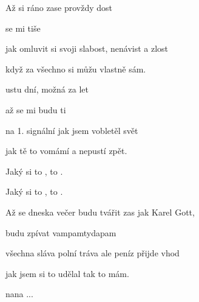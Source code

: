 

\zs
Až si  ráno  zase
 provždy dost

 se mi  tiše 

jak omluvit si svoji slabost, nenávist a zlost

když za všechno si můžu vlastně sám.
\ks

\zr
{}ustu dní, možná za  let

až se mi  budu ti 

na 1. signální jak jsem vobletěl svět

jak tě to vomámí a nepustí zpět.

Jaký si to ,  to .

Jaký si to ,  to .
\kr

\zs
Až se dneska večer budu tvářit zas jak Karel Gott,

budu zpívat vampamtydapam

všechna sláva polní tráva ale peníz přijde vhod

jak jsem si to udělal tak to mám.
\ks

\zr  \kr

nana ...

\kp






